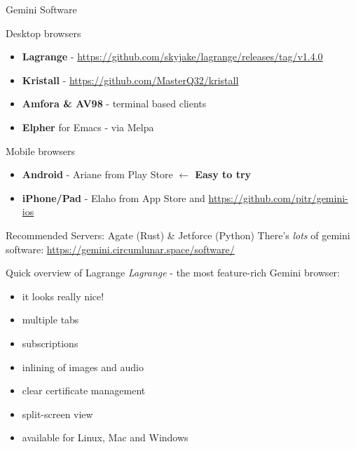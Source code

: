 \documentclass[presentation, 11pt,  aspectratio=169]{beamer}
\renewcommand{\alert}[1]{\textbf{\textcolor{mydarkred}{#1}}}
\begin{document}
\begin{frame}[label={sec:orgc35ad1d}]{Gemini Software}
\begin{block}{Desktop browsers}
\begin{itemize}
\item \alert{Lagrange} - \url{https://github.com/skyjake/lagrange/releases/tag/v1.4.0}\\
\item \alert{Kristall} - \url{https://github.com/MasterQ32/kristall}\\
\item \alert{Amfora \& AV98} - terminal based clients\\
\item \alert{Elpher} for Emacs - via Melpa\\
\end{itemize}
\end{block}
\begin{block}{Mobile browsers}
\begin{itemize}
\item \alert{Android} - Ariane from Play Store \alert{\(\leftarrow\) Easy to try}\\
\item \alert{iPhone/Pad} - Elaho from App Store and \url{https://github.com/pitr/gemini-ios}\\
\end{itemize}
\end{block}

\begin{block}{Recommended Servers: Agate (Rust) \& Jetforce (Python)}
There's \emph{lots} of gemini software: \url{https://gemini.circumlunar.space/software/}\\
\end{block}
\end{frame}
\begin{frame}[label={sec:org6188524}]{Quick overview of Lagrange}
\emph{Lagrange} - the most feature-rich Gemini browser:\\
\begin{itemize}
\item it looks really nice!\\
\item multiple tabs\\
\item subscriptions\\
\item inlining of images and audio\\
\item clear certificate management\\
\item split-screen view\\
\item available for Linux, Mac and Windows\\
\end{itemize}
\end{frame}
\end{document}
